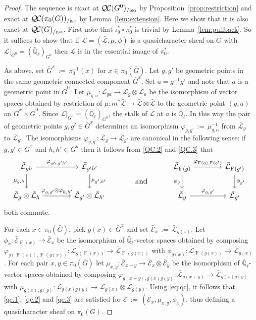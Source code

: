 \documentclass[CM,Submssn,SecEq]{degruyter-crelle} %
\theoremstyle{plain}
\theoremstyle{definition}
\theoremstyle{remark}
\newcommand{\EE}{\mathbb{\bar Q}_\ell}
\newcommand{\Frob}[1]{\operatorname{F}_{#1}}
\newcommand{\ceq}{{\, :=\, }}
\newcommand{\qcs}[1]{{\mathcal{#1}}}
\newcommand{\gqcs}[1]{{\mathcal{\bar #1}}}
\newcommand{\QC}{{\mathcal{Q\hskip-0.8pt C}}}
\newcommand{\QCiso}[1]{\QC(#1)_{/\text{iso}}}
\newcommand{\bG}{\bar{G}}
\begin{document}
\begin{proof}
The sequence is exact at $\QCiso{G^0}$ by Proposition~\ref{prop:restriction}
and exact at $\QCiso{\pi_0(G)}$ by Lemma~\ref{lem:extension}.
Here we show that it is also exact at $\QCiso{G}$.
First note that $\iota_0^* \circ \pi_0^*$ is trivial by Lemma~\ref{lem:pullback}.
So it suffices to show that if $\qcs{L} = (\gqcs{L},\mu,\phi)$ is a quasicharacter sheaf on $G$
with $\qcs{L}\vert_{G^0} = (\EE)_{G^0}$ then $\qcs{L}$ is in the essential image of $\pi_0^*$.

As above, set $\bG^x \ceq \pi_0^{-1}(x)$ for $x\in \pi_0(\bG)$.
Let $g, g'$ be geometric points in the same
geometric connected component $\bG^x$.
Set $a = g^{-1}g'$ and note that $a$ is a geometric point in $\bG^0$.
Let $\mu_{g,a} : \gqcs{L}_{ga} \to \gqcs{L}_g \otimes \gqcs{L}_a$
be the isomorphism of vector spaces obtained by restriction of
$\mu : m^*\gqcs{L} \to \gqcs{L} \boxtimes \gqcs{L}$ to the
geometric point $(g,a)$ on $\bG^x \times \bG^0$.
Since $\qcs{L}\vert_{G^0} = (\EE)_{G^0}$,
the stalk of $\gqcs{L}$ at $a$ is $\EE$.
In this way the pair of geometric points $g, g' \in \bG^x$
determines an isomorphism $\varphi_{g,g'} \ceq \mu_{g,a}^{-1}$
from $\gqcs{L}_{g}$ to $\gqcs{L}_{g'}$.
%
The isomorphisms $\varphi_{g,g'}: \gqcs{L}_{g} \to \gqcs{L}_{g'}$ are canonical
in the following sense: if $g,g'\in \bG^x$ and $h,h'\in \bG^y$
then it follows from \ref{QC.2} and \ref{QC.3}
that
 \begin{equation}\label{eq:qc}
  \begin{tikzcd}[column sep=40]
   \gqcs{L}_{gh} \arrow{r}{\varphi_{gh,g'h'}} \arrow[swap]{d}{\mu_{g,h}}
  & \gqcs{L}_{g'h'} \arrow{d}{\mu_{g',h'}}
  &\arrow[draw=none]{d}[pos=.4,description]{\text{\normalsize{and}}}
  &  \gqcs{L}_{\Frob{}(g)} \arrow{r}{\varphi_{\Frob{}(g),\Frob{}(g')}} \arrow[swap]{d}{\phi_{g}} & \gqcs{L}_{\Frob{}(g')} \arrow{d}{\phi_{g'}} \\
  \gqcs{L}_{g} \otimes \gqcs{L}_{h} \arrow{r}{\varphi_{g,g'}\otimes \varphi_{h,h'}}
  & \gqcs{L}_{g'} \otimes \gqcs{L}_{h'}
  & {}
  & \gqcs{L}_{g} \arrow{r}{\varphi_{g,g'}} & \gqcs{L}_{g'}
  \end{tikzcd}
 \end{equation}
both commute.

For each $x\in \pi_0(\bG)$, pick $g(x)\in \bG^x$
and set $\gqcs{E}_x \ceq \gqcs{L}_{g(x)}$.
Let $\phi_x : \gqcs{E}_{\Frob{}(x)} \to \gqcs{E}_x$
be the isomorphism of $\EE$-vector spaces obtained by composing
$\varphi_{g(\Frob{}(x)),\Frob{}(g(x))} : \gqcs{L}_{g(\Frob{}(x))} \to \gqcs{L}_{\Frob{}(g(x))}$
with $\phi_{g(x)} : \gqcs{L}_{\Frob{}(g(x))} \to \gqcs{L}_{g(x)}$.
For each pair $x,y\in \pi_0(\bG)$
let $\mu_{x,y} : \gqcs{E}_{x+y}\to \gqcs{E}_x\otimes \gqcs{E}_y$
be the isomorphism of $\EE$-vector spaces obtained by composing
$\varphi_{g(x+y),g(x)g(y)} : \gqcs{L}_{g(x+y)} \to \gqcs{L}_{g(x)g(y)}$
with $\mu_{g(x),g(y)} : \gqcs{L}_{g(x)g(y)} \to \gqcs{L}_{g(x)}\otimes \gqcs{L}_{g(y)}$.
Using \eqref{eq:qc}, it follows that \ref{qc.1}, \ref{qc.2} and \ref{qc.3} are satisfied for
$\qcs{E} \ceq (\gqcs{E}_x, \mu_{x,y}, \phi_x)$, thus defining a quasicharacter sheaf on $\pi_0(G)$.


\end{proof}
\end{document}
